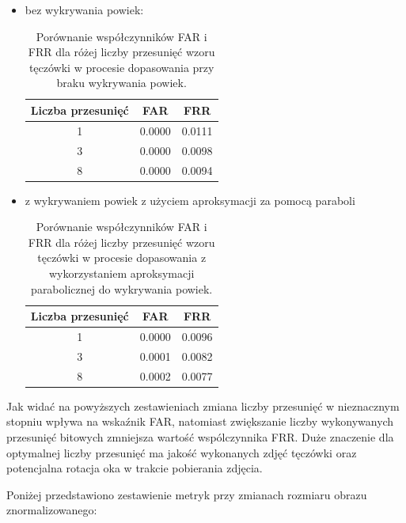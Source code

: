 \documentclass[10pt,polish,a4paper,oneside]{ppfcmthesis}
\begin{document}
\begin{itemize}

  \item bez wykrywania powiek:

  \begin{table}[ht]
    \centering
    \begin{tabular}{c|c|c}
      \rowcolor{gray!20}
      Liczba przesunię\'c & FAR & FRR \\
      \hline\hline
      1 & 0.0000 & 0.0111 \\
      \hline
      3 & 0.0000 & 0.0098 \\
      \hline
      8 & 0.0000 & 0.0094 \\
    \end{tabular}
    \caption{Porównanie współczynników FAR i FRR dla różej liczby przesunię\'c wzoru tęczówki w procesie dopasowania
    przy braku wykrywania powiek.}
  \end{table}

  \item z wykrywaniem powiek z użyciem aproksymacji za pomocą paraboli

  \begin{table}[ht]
    \centering
    \begin{tabular}{c|c|c}
      \rowcolor{gray!20}
      Liczba przesunię\'c & FAR & FRR \\
      \hline\hline
      1 & 0.0000 & 0.0096 \\
      \hline
      3 & 0.0001 & 0.0082 \\
      \hline
      8 & 0.0002 & 0.0077 \\
    \end{tabular}
    \caption{Porównanie współczynników FAR i FRR dla różej liczby przesunię\'c wzoru tęczówki w procesie dopasowania
    z wykorzystaniem aproksymacji parabolicznej do wykrywania powiek.}
  \end{table}
\end{itemize}

Jak wida\'c na powyższych zestawieniach zmiana liczby przesunię\'c w nieznacznym stopniu wpływa
na wska\'znik FAR, natomiast zwiększanie liczby wykonywanych przesunię\'c bitowych zmniejsza wartoś\'c
wspólczynnika FRR. Duże znaczenie dla optymalnej liczby przesunię\'c ma jakoś\'c wykonanych zdję\'c tęczówki
oraz potencjalna rotacja oka w trakcie pobierania zdjęcia.

\noindent
Poniżej przedstawiono zestawienie metryk przy zmianach rozmiaru obrazu znormalizowanego:
\end{document}
